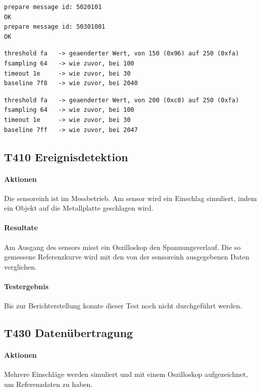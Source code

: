 \begin{lstlisting}[caption=T400 Sendeprotokoll am \gls{logger}, label=t400.4]
prepare message id: 5020101
OK
prepare message id: 50301001
OK
\end{lstlisting}

\begin{lstlisting}[caption=T400 Konfiguration aus Sensor 3, label=t400.5]
threshold fa   -> geaenderter Wert, von 150 (0x96) auf 250 (0xfa)
fsampling 64   -> wie zuvor, bei 100
timeout 1e     -> wie zuvor, bei 30
baseline 7f8   -> wie zuvor, bei 2040
\end{lstlisting}

\begin{lstlisting}[caption=T400 Konfiguration aus Sensor 2, label=t400.6]
threshold fa   -> geaenderter Wert, von 200 (0xc8) auf 250 (0xfa)
fsampling 64   -> wie zuvor, bei 100
timeout 1e     -> wie zuvor, bei 30
baseline 7ff   -> wie zuvor, bei 2047
\end{lstlisting}


\subsection{T410 Ereignisdetektion}
\paragraph{Aktionen} Die \gls{sensoreinh} ist im Messbetrieb. Am \gls{sensor} wird ein Einschlag simuliert, indem ein Objekt auf die Metallplatte geschlagen wird. 

\paragraph{Resultate} Am Ausgang des \gls{sensor}s misst ein Oszilloskop den Spannungsverlauf. Die so gemessene Referenzkurve wird mit den von der \gls{sensoreinh} ausgegebenen Daten verglichen.

\paragraph{Testergebnis} Bis zur Berichterstellung konnte dieser Test noch nicht durchgeführt werden.

\subsection{T430 Datenübertragung}
\paragraph{Aktionen} Mehrere Einschläge werden simuliert und mit einem Oszilloskop aufgezeichnet, um Referenzdaten zu haben.

